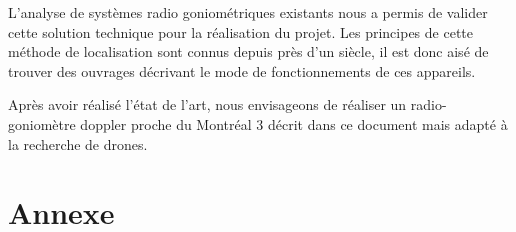 \documentclass[a4paper, 11pt, oneside]{memoir}
\newcounter{th}[chapter]
\begin{document}
L'analyse de systèmes radio goniométriques existants nous a permis de valider cette solution technique pour la réalisation du projet. Les principes de cette méthode de localisation sont connus depuis près d'un siècle, il est donc aisé de trouver des ouvrages décrivant le mode de fonctionnements de ces appareils.

Après avoir réalisé l'état de l'art, nous envisageons de réaliser un radio-goniomètre doppler proche du Montréal 3 décrit dans ce document mais adapté à la recherche de drones.   

\newpage


\part*{Annexe}
\appendix
\nocite{*}



\newpage
\listoffigures
\printindex


\end{document}
